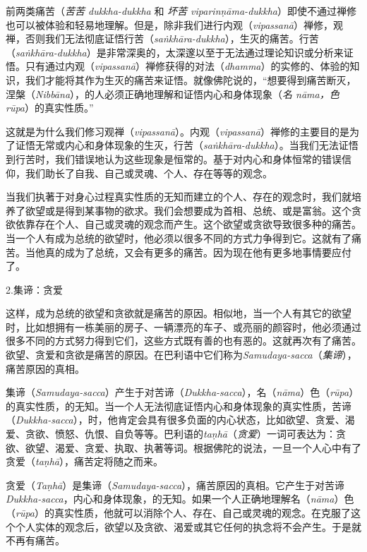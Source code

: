 前两类痛苦（{\it 苦苦 dukkha-dukkha} 和 {\it 坏苦 viparin\d n\=ama-dukkha}）即使不通过禅修也可以被体验和轻易地理解。但是，除非我们进行内观（{\it vipassan\=a}）禅修，观禅，否则我们无法彻底证悟行苦（{\it sa\.nkh\=ara-dukkha}），生灭的痛苦。行苦（{\it sa\.nkh\=ara-dukkha}）是非常深奥的，太深邃以至于无法通过理论知识或分析来证悟。只有通过内观（{\it vipassan\=a}）禅修获得的对法（{\it dhamma}）的实修的、体验的知识，我们才能将其作为生灭的痛苦来证悟。就像佛陀说的，“想要得到痛苦断灭，涅槃（{\it Nibb\=ana}），的人必须正确地理解和证悟内心和身体现象（{\it 名 n\=ama，色 r\=upa}）的真实性质。”

这就是为什么我们修习观禅（{\it vipassan\=a}）。内观（{\it vipassan\=a}）禅修的主要目的是为了证悟无常或内心和身体现象的生灭，行苦（{\it sa\.nkh\=ara-dukkha}）。当我们无法证悟到行苦时，我们错误地认为这些现象是恒常的。基于对内心\1和身体恒常的错误信仰，我们助长了自我、自己或灵魂、个人、存在等等的观念。

当我们执著于对身心过程真实性质的无知而建立的个人、存在的观念时，我们就培养了欲望或是得到某事物的欲求。我们会想要成为首相、总统、或是富翁。这个贪欲依靠存在个人、自己或灵魂的观念而产生。这个欲望或贪欲导致很多种的痛苦。当一个人有成为总统的欲望时，他必须以很多不同的方式力争得到它。这就有了痛苦。当他真的成为了总统，又会有更多的痛苦。因为现在他有更多地事情要应付了。

\sssubsectnon 2.集谛：贪爱

这样，成为总统的欲望和贪欲就是痛苦的原因。相似地，当一个人有其它的欲望时，比如想拥有一栋美丽的房子、一辆漂亮的车子、或亮丽的颜容时，他必须通过很多不同的方式努力得到它们，这些方式既有善的也有恶的。这就再次有了痛苦。欲望、贪爱和贪欲是痛苦的原因。在巴利语中它们称为{\it Samudaya-sacca}（{\it 集谛}），痛苦原因的真相。

集谛（{\it Samudaya-sacca}）产生于对苦谛（{\it Dukkha-sacca}），名（{\it n\=ama}）色（{\it r\=upa}）的真实性质，的无知。当一个人无法彻底证悟内心和身体现象的真实性质，苦谛（{\it Dukkha-sacca}），时，他肯定会具有很多负面的内心状态，比如欲望、贪爱、渴爱、贪欲、愤怒、仇恨、自负等等。巴利语的{\it ta\d nh\=a}（{\it 贪爱}）一词可表达为：贪欲、欲望、渴爱、贪爱、执取、执著等词。根据佛陀的说法，一旦一个人\1心中有了贪爱（{\it ta\d nh\=a}），痛苦定将随之而来。

贪爱（{\it Ta\d nh\=a}）是集谛（{\it Samudaya-sacca}），痛苦原因的真相。它产生于对苦谛{\it Dukkha-sacca}，内心和身体现象，的无知。如果一个人正确地理解名（{\it n\=ama}）色（{\it r\=upa}）的真实性质，他就可以消除个人、存在、自己或灵魂的观念。在克服了这个个人实体的观念后，欲望以及贪欲、渴爱或其它任何的执念将不会产生。于是就不再有痛苦。

